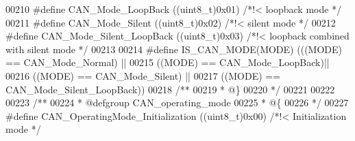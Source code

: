 \begin{DoxyCode}
00210 \textcolor{preprocessor}{#}\textcolor{preprocessor}{define} \textcolor{preprocessor}{CAN\_Mode\_LoopBack}           \textcolor{preprocessor}{(}\textcolor{preprocessor}{(}\textcolor{preprocessor}{uint8\_t}\textcolor{preprocessor}{)}0x01\textcolor{preprocessor}{)}  \textcolor{comment}{/*!< loopback mode */}
00211 \textcolor{preprocessor}{#}\textcolor{preprocessor}{define} \textcolor{preprocessor}{CAN\_Mode\_Silent}             \textcolor{preprocessor}{(}\textcolor{preprocessor}{(}\textcolor{preprocessor}{uint8\_t}\textcolor{preprocessor}{)}0x02\textcolor{preprocessor}{)}  \textcolor{comment}{/*!< silent mode */}
00212 \textcolor{preprocessor}{#}\textcolor{preprocessor}{define} \textcolor{preprocessor}{CAN\_Mode\_Silent\_LoopBack}    \textcolor{preprocessor}{(}\textcolor{preprocessor}{(}\textcolor{preprocessor}{uint8\_t}\textcolor{preprocessor}{)}0x03\textcolor{preprocessor}{)}  \textcolor{comment}{/*!< loopback combined with silent mode */}
00213 
00214 \textcolor{preprocessor}{#}\textcolor{preprocessor}{define} \textcolor{preprocessor}{IS\_CAN\_MODE}\textcolor{preprocessor}{(}\textcolor{preprocessor}{MODE}\textcolor{preprocessor}{)} \textcolor{preprocessor}{(}\textcolor{preprocessor}{(}\textcolor{preprocessor}{(}\textcolor{preprocessor}{MODE}\textcolor{preprocessor}{)} \textcolor{preprocessor}{==} CAN_Mode_Normal\textcolor{preprocessor}{)} \textcolor{preprocessor}{||}
00215                            \textcolor{preprocessor}{(}\textcolor{preprocessor}{(}\textcolor{preprocessor}{MODE}\textcolor{preprocessor}{)} \textcolor{preprocessor}{==} CAN_Mode_LoopBack\textcolor{preprocessor}{)}\textcolor{preprocessor}{||}
00216                            \textcolor{preprocessor}{(}\textcolor{preprocessor}{(}\textcolor{preprocessor}{MODE}\textcolor{preprocessor}{)} \textcolor{preprocessor}{==} CAN_Mode_Silent\textcolor{preprocessor}{)} \textcolor{preprocessor}{||}
00217                            \textcolor{preprocessor}{(}\textcolor{preprocessor}{(}\textcolor{preprocessor}{MODE}\textcolor{preprocessor}{)} \textcolor{preprocessor}{==} CAN_Mode_Silent_LoopBack\textcolor{preprocessor}{)}\textcolor{preprocessor}{)}
00218 \textcolor{comment}{/**}
00219 \textcolor{comment}{  * @\}}
00220 \textcolor{comment}{  */}
00221 
00222 
00223  \textcolor{comment}{/**}
00224 \textcolor{comment}{  * @defgroup CAN\_operating\_mode }
00225 \textcolor{comment}{  * @\{}
00226 \textcolor{comment}{  */}
00227 \textcolor{preprocessor}{#}\textcolor{preprocessor}{define} \textcolor{preprocessor}{CAN\_OperatingMode\_Initialization}  \textcolor{preprocessor}{(}\textcolor{preprocessor}{(}\textcolor{preprocessor}{uint8\_t}\textcolor{preprocessor}{)}0x00\textcolor{preprocessor}{)} \textcolor{comment}{/*!< Initialization mode */}

\end{DoxyCode}
